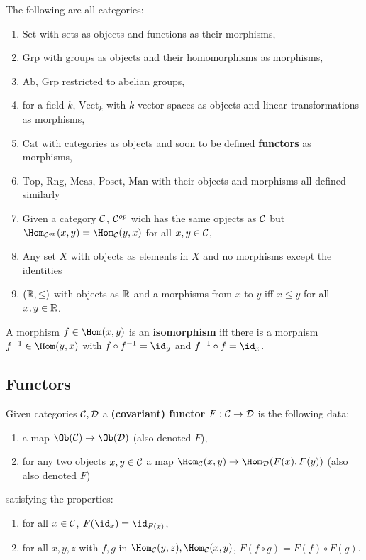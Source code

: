 \documentclass[../Year2.tex]{subfiles}
\begin{document}
\begin{examples}
    The following are all categories:
    \begin{enumerate}
        \item $\text{Set}$ with sets as objects and functions as their morphisms,
        \item $\text{Grp}$ with groups as objects and their homomorphisms as morphisms,
        \item $\text{Ab}$, $\text{Grp}$ restricted to abelian groups,
        \item for a field $k$, $\text{Vect}_k$ with $k$-vector spaces as objects and linear transformations as morphisms,
        \item $\text{Cat}$ with categories as objects and soon to be defined \textbf{functors} as morphisms,
        \item $\text{Top}$, $\text{Rng}$, $\text{Meas}$, $\text{Poset}$, $\text{Man}$ with their objects and morphisms all defined similarly
        \item Given a category $\mathcal{C}$, $\mathcal{C}^{op}$ wich has the same opjects as $\mathcal{C}$ but $\Hom_{\CCC^{op}}(x,y)=\Hom_\CCC(y,x)$ for all $x,y\in\mathcal{C}$,
        \item Any set $X$ with objects as elements in $X$ and no morphisms except the identities
        \item $(\mathbb{R},\leq)$ with objects as $\mathbb{R}$ and a morphisms from $x$ to $y$ iff $x\leq y$ for all $x,y\in\mathbb{R}$.
    \end{enumerate}
\end{examples}

\begin{definition}[Isomorphism]
    A morphism $f\in\Hom(x,y)$ is an \textbf{isomorphism} iff there is a morphism $f^{-1}\in\Hom(y,x)$ with $f\circ f^{-1} = \id_y$ and $f^{-1}\circ f = \id_x$.
\end{definition}

\subsection{Functors}

\begin{definition}
    Given categories $\mathcal{C},\mathcal{D}$ a \textbf{(covariant) functor} $F:\mathcal{C}\rightarrow\mathcal{D}$ is the following data: \begin{enumerate}
        \item a map $\Ob(\CCC)\rightarrow\Ob(\DDD)$ (also denoted $F$),
        \item for any two objects $x,y\in\mathcal{C}$ a map $\Hom_\CCC(x,y)\rightarrow\Hom_\DDD(F(x),F(y))$ (also also denoted $F$)
    \end{enumerate}
    satisfying the properties: \begin{enumerate}
        \item for all $x\in\mathcal{C}$, $F(\id_x)=\id_{F(x)}$,
        \item for all $x,y,z$ with $f,g$ in $\Hom_\CCC(y,z), \Hom_\CCC(x,y)$, $F(f \circ g) = F(f)\circ F(g)$.
    \end{enumerate}
\end{definition}
\end{document}
